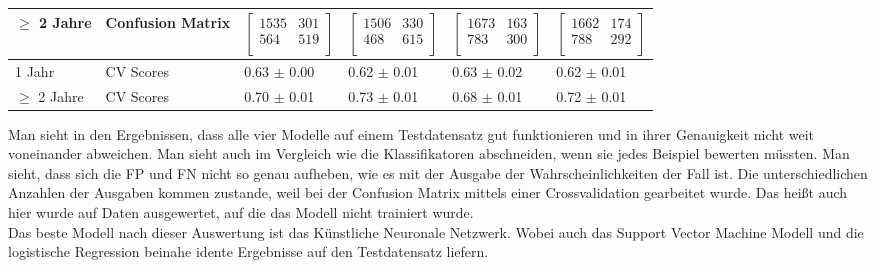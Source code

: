 \begin{table}[ht]
\begin{tabular}{ p{2cm} p{2cm} p{2cm} p{2cm} p{2cm} p{2cm} }
    $\geq$ 2 Jahre & Confusion Matrix & $\left[ \begin{array}{rr} 1535 & 301 \\  564 & 519 \\  \end{array}\right]$ & $\left[ \begin{array}{rr} 1506 & 330  \\  468 & 615 \\  \end{array}\right]$ & $\left[ \begin{array}{rr} 1673 & 163  \\  783 & 300 \\  \end{array}\right]$ & $\left[ \begin{array}{rr} 1662 & 174  \\  788 & 292 \\  \end{array}\right]$ \\

    \midrule
    1 Jahr         & CV Scores        & 0.63 $\pm$ 0.00                            & 0.62 $\pm$ 0.01                            & 0.63 $\pm$ 0.02                            & 0.62 $\pm$ 0.01                            \\
    $\geq$ 2 Jahre & CV Scores        & 0.70 $\pm$ 0.01                            & 0.73 $\pm$ 0.01                            & 0.68 $\pm$ 0.01                            & 0.72 $\pm$ 0.01                            \\

    \bottomrule
  \end{tabular}

\end{table}

Man sieht in den Ergebnissen, dass alle vier Modelle auf einem Testdatensatz gut funktionieren und in ihrer Genauigkeit nicht weit voneinander
abweichen. Man sieht auch im Vergleich wie die Klassifikatoren abschneiden, wenn sie jedes Beispiel bewerten m\"ussten. Man sieht, dass sich die FP und FN nicht
so genau aufheben, wie es mit der Ausgabe der Wahrscheinlichkeiten der Fall ist. Die unterschiedlichen Anzahlen der Ausgaben kommen zustande, weil bei der Confusion Matrix
mittels einer Crossvalidation gearbeitet wurde. Das hei{\ss}t auch hier wurde auf Daten ausgewertet, auf die das Modell nicht trainiert wurde. \\

Das beste Modell nach dieser Auswertung ist das K\"unstliche Neuronale Netzwerk. Wobei auch das Support Vector Machine Modell und die logistische Regression beinahe
idente Ergebnisse auf den Testdatensatz liefern. \\








